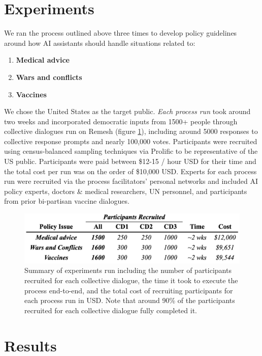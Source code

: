 \documentclass{article}
\begin{document}
\section{Experiments}
We ran the process outlined above three times to develop policy guidelines around how AI assistants should handle situations related to:
\begin{enumerate}
    \item \textbf{Medical advice}
    \item \textbf{Wars and conflicts}
    \item \textbf{Vaccines}
\end{enumerate}

We chose the United States as the target public. \emph{Each process run} took around two weeks and incorporated democratic inputs from 1500+ people through collective dialogues run on Remesh (figure \ref{fig:experiments table}), including around 5000 responses to collective response prompts and nearly 100,000 votes. Participants were recruited using census-balanced sampling techniques via Prolific to be representative of the US public. Participants were paid between \$12-15 / hour USD for their time and the total cost per run was on the order of \$10,000 USD. Experts for each process run were recruited via the process facilitators' personal networks and included AI policy experts, doctors \& medical researchers, UN personnel, and participants from prior bi-partisan vaccine dialogues. 

\begin{figure}[H]
\centering
  \includegraphics[width=0.69\linewidth]{figs/experiments_table.png}
  \caption{Summary of experiments run including the number of participants recruited for each collective dialogue, the time it took to execute the process end-to-end, and the total cost of recruiting participants for each process run in USD. Note that around 90\% of the participants recruited for each collective dialogue fully completed it.}
  \label{fig:experiments table}
\end{figure}

\section{Results}
\end{document}
